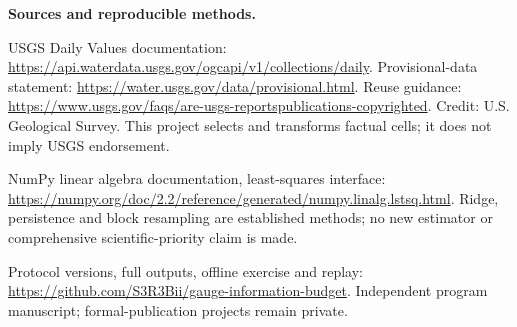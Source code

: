 \documentclass[11pt]{article}
\begin{document}
\small\textbf{Sources and reproducible methods.}\par
USGS Daily Values documentation: \url{https://api.waterdata.usgs.gov/ogcapi/v1/collections/daily}. Provisional-data statement: \url{https://water.usgs.gov/data/provisional.html}. Reuse guidance: \url{https://www.usgs.gov/faqs/are-usgs-reportspublications-copyrighted}. Credit: U.S. Geological Survey. This project selects and transforms factual cells; it does not imply USGS endorsement.\par
NumPy linear algebra documentation, least-squares interface: \url{https://numpy.org/doc/2.2/reference/generated/numpy.linalg.lstsq.html}. Ridge, persistence and block resampling are established methods; no new estimator or comprehensive scientific-priority claim is made.\par
Protocol versions, full outputs, offline exercise and replay: \url{https://github.com/S3R3Bii/gauge-information-budget}. Independent program manuscript; formal-publication projects remain private.
\end{document}
